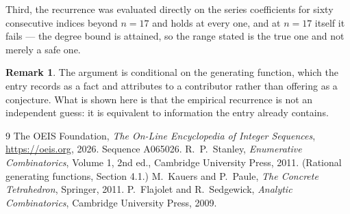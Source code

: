 \documentclass[11pt,a4paper]{article}
\theoremstyle{plain}
\theoremstyle{definition}
\newtheorem{remark}[theorem]{Remark}
\begin{document}
Third, the recurrence was evaluated directly on the series coefficients for sixty consecutive
indices beyond $n=17$ and holds at every one, and at $n=17$ itself it fails --- the
degree bound is attained, so the range stated is the true one and not merely a safe one.

\begin{remark}
The argument is conditional on the generating function, which the entry records as a fact and
attributes to a contributor rather than offering as a conjecture. What is shown here is that
the empirical recurrence is not an independent guess: it is equivalent to information the
entry already contains.
\end{remark}

\begin{thebibliography}{9}
 The OEIS Foundation, \emph{The On-Line Encyclopedia of Integer
Sequences}, \url{https://oeis.org}, 2026. Sequence A065026.
 R.~P.~Stanley, \emph{Enumerative Combinatorics}, Volume 1, 2nd ed.,
Cambridge University Press, 2011. (Rational generating functions, Section 4.1.)
 M.~Kauers and P.~Paule, \emph{The Concrete Tetrahedron}, Springer, 2011.
 P.~Flajolet and R.~Sedgewick, \emph{Analytic Combinatorics}, Cambridge
University Press, 2009.
\end{thebibliography}
\end{document}
